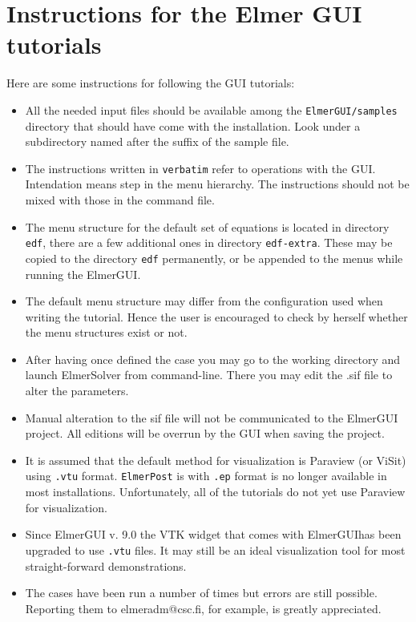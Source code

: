 \chapter*{Instructions for the Elmer GUI tutorials}

Here are some instructions for following the GUI tutorials:
\begin{itemize}
\item All the needed input files should be available among the \texttt{ElmerGUI/samples} 
  directory that should have come with the installation. Look under a subdirectory
  named after the suffix of the sample file.
%
\item The instructions written in \texttt{verbatim} refer to operations 
  with the GUI. Intendation means step in the menu hierarchy. 
  The instructions should not be mixed with those in the command file. 
%
\item The menu structure for the default set of equations is located 
  in directory \texttt{edf}, there are a few additional ones in 
  directory \texttt{edf-extra}. These may be copied to the directory \texttt{edf}
  permanently, or be appended to the menus while running the ElmerGUI. 
%
\item The default menu structure may differ from the configuration used
  when writing the tutorial. Hence the user is encouraged to check by herself 
  whether the menu structures exist or not. 
%
\item After having once defined the case you may go to the working directory 
  and launch ElmerSolver from command-line. There you may edit the .sif file 
  to alter the parameters.
%
\item Manual alteration to the sif file will not be communicated to the
  ElmerGUI project. All editions will be overrun by the GUI when saving the 
  project.
%
\item It is assumed that the default method for visualization is Paraview (or ViSit) using \texttt{.vtu} format.
  \texttt{ElmerPost} is with \texttt{.ep} format is no longer available in most installations.
  Unfortunately, all of the tutorials do not yet use Paraview for visualization.
  
\item Since ElmerGUI v. 9.0 the VTK widget that comes with
  ElmerGUIhas been upgraded to use \texttt{.vtu} files. It may still be an ideal visualization tool
  for most straight-forward demonstrations.
%
\item The cases have been run a number of times but errors are still possible.
  Reporting them to elmeradm@csc.fi, for example, is greatly appreciated. 
  
\end{itemize}







